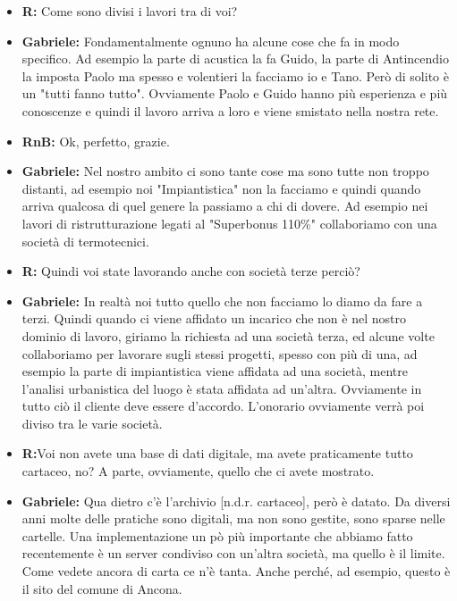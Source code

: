 \documentclass{elegantbook}
\begin{document}
\begin{itemize}
		\item\textbf{R}\textbf{:} Come sono divisi i lavori tra di voi?
		\item\textbf{Gabriele}\textbf{:} Fondamentalmente ognuno ha alcune cose che fa in modo specifico. Ad esempio la parte di acustica la fa Guido, la parte di
                    Antincendio la imposta Paolo ma spesso e volentieri la facciamo io e Tano. Però di solito è un "tutti fanno tutto". Ovviamente Paolo e Guido hanno più
                    esperienza e più conoscenze e quindi il lavoro arriva a loro e viene smistato nella nostra rete.
		\item\textbf{RnB}\textbf{:} Ok, perfetto, grazie.
		\item\textbf{Gabriele}\textbf{:} Nel nostro ambito ci sono tante cose ma sono tutte non troppo distanti, ad esempio noi "Impiantistica" non la facciamo e
                    quindi quando arriva qualcosa di quel genere la passiamo a chi di dovere. Ad esempio nei lavori di ristrutturazione legati al "Superbonus 110\%"
                    collaboriamo con una società di termotecnici.
		\item\textbf{R}\textbf{:} Quindi voi state lavorando anche con società terze perciò? 
		\item\textbf{Gabriele}\textbf{:} In realtà noi tutto quello che non facciamo lo diamo da fare a terzi. Quindi quando ci viene affidato un incarico che non è
                    nel nostro dominio di lavoro, giriamo la richiesta ad una società terza, ed alcune volte collaboriamo per lavorare sugli stessi progetti, spesso con più
                    di una, ad esempio la parte di impiantistica viene affidata ad una società, mentre l'analisi urbanistica del luogo è stata affidata ad un'altra.
                    Ovviamente in tutto ciò il cliente deve essere d'accordo. L'onorario ovviamente verrà poi diviso tra le varie società.
		\item\textbf{R}\textbf{:}Voi non avete una base di dati digitale, ma avete praticamente tutto cartaceo, no? A parte,  ovviamente, quello che ci avete mostrato.
		\item\textbf{Gabriele}\textbf{:} Qua dietro c'è l'archivio [n.d.r. cartaceo], però è datato. Da diversi anni molte delle pratiche sono digitali, ma non sono
                    gestite, sono sparse nelle cartelle. Una implementazione un pò più importante che abbiamo fatto recentemente è un server condiviso con un'altra società,
                    ma quello è il limite. Come vedete ancora di carta ce n'è tanta. Anche perché, ad esempio, questo è il sito del comune di Ancona.
		\\
	\end{itemize}
	
\end{document}
